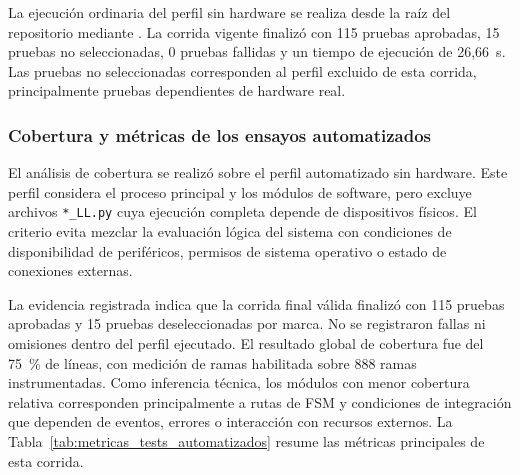 La ejecución ordinaria del perfil sin hardware se realiza desde la raíz del repositorio mediante \texttt{}. La corrida vigente finalizó con 115 pruebas aprobadas, 15 pruebas no seleccionadas, 0 pruebas fallidas y un tiempo de ejecución de 26,66~s. Las pruebas no seleccionadas corresponden al perfil excluido de esta corrida, principalmente pruebas dependientes de hardware real.

\subsubsection{Cobertura y métricas de los ensayos automatizados}

El análisis de cobertura se realizó sobre el perfil automatizado sin hardware. Este perfil considera el proceso principal y los módulos de software, pero excluye archivos \texttt{*\_LL.py} cuya ejecución completa depende de dispositivos físicos. El criterio evita mezclar la evaluación lógica del sistema con condiciones de disponibilidad de periféricos, permisos de sistema operativo o estado de conexiones externas.

La evidencia registrada indica que la corrida final válida finalizó con 115 pruebas aprobadas y 15 pruebas deseleccionadas por marca. No se registraron fallas ni omisiones dentro del perfil ejecutado. El resultado global de cobertura fue del 75~\% de líneas, con medición de ramas habilitada sobre 888 ramas instrumentadas. Como inferencia técnica, los módulos con menor cobertura relativa corresponden principalmente a rutas de FSM y condiciones de integración que dependen de eventos, errores o interacción con recursos externos. La Tabla~\ref{tab:metricas_tests_automatizados} resume las métricas principales de esta corrida.

